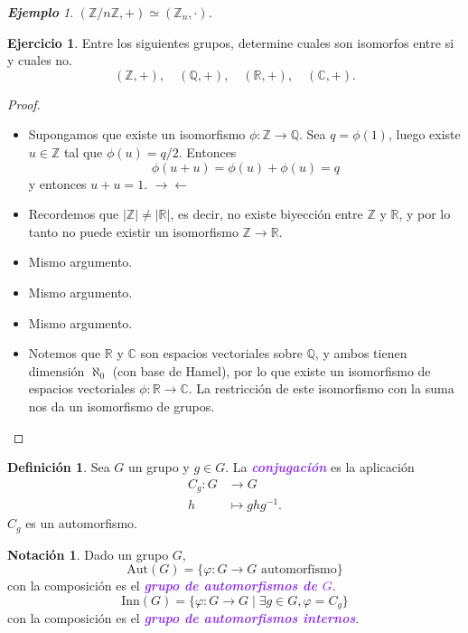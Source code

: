 \documentclass{article}
\theoremstyle{definition}
\newtheorem{definition}[theorem]{Definición}
\newtheorem{exercise}{Ejercicio}
\newtheorem*{notation}{Notación}
\theoremstyle{remark}
\newtheorem{example}[theorem]{\textbf{Ejemplo}}
\numberwithin{equation}{section}
\newcommand{\C}{\mathbb{C}}
\newcommand{\Q}{\mathbb{Q}}
\newcommand{\R}{\mathbb{R}}
\newcommand{\Z}{\mathbb{Z}}
\newcommand{\Aut}{\mathrm{Aut}}
\newcommand{\Inn}{\mathrm{Inn}}
\newcommand{\zmz}[1]{\Z/ #1 \Z}
\newcommand{\wea}[1]{\textcolor{BlueViolet}{\textbf{\emph{#1}}}}
\begin{document}
\begin{example}
  $(\zmz n, +) \simeq (\Z_n, \cdot)$.
\end{example}

\begin{exercise}
  Entre los siguientes grupos, determine cuales son isomorfos entre si y cuales no.
  \[(\Z,+), \quad (\Q,+), \quad (\R,+), \quad (\C,+).\]
\end{exercise}
\begin{proof}\
  \begin{itemize}
    \item \boxed{\Z \not\simeq \Q} Supongamos que existe un isomorfismo $\phi \colon \Z \to \Q$. Sea $q = \phi(1)$, luego existe $u \in \Z$ tal que $\phi(u) = q/2$. Entonces $$\phi(u+u) = \phi(u) + \phi(u) = q$$ y entonces $u+u = 1$. $\to\gets$
    \item \boxed{\Z \not\simeq \R} Recordemos que $|\Z| \neq |\R|$, es decir, no existe biyección entre $\Z$ y $\R$, y por lo tanto no puede existir un isomorfismo $\Z \to \R$.
    \item \boxed{\Z \not\simeq \C} Mismo argumento.
    \item \boxed{\Q \not\simeq \R} Mismo argumento.
    \item \boxed{\Q \not\simeq \C} Mismo argumento.
    \item \boxed{\R \simeq \C} Notemos que $\R$ y $\C$ son espacios vectoriales sobre $\Q$, y ambos tienen dimensión $\aleph_0$ (con base de Hamel), por lo que existe un isomorfismo de espacios vectoriales $\phi \colon \R \to \C$. La restricción de este isomorfismo con la suma nos da un isomorfismo de grupos.
  \end{itemize}
\end{proof}

\begin{definition}
  Sea $G$ un grupo y $g \in G$. La \wea{conjugación} es la aplicación
  \begin{align*}
    C_g \colon G &\to G \\
    h &\mapsto ghg^{-1}.
  \end{align*}
  $C_g$ es un automorfismo.
\end{definition}

\begin{notation}
  Dado un grupo $G$,
  $$\Aut(G) = \{\varphi \colon G \to G \text{ automorfismo}\}$$
  con la composición es el \wea{grupo de automorfismos de $G$}.
  $$\Inn(G) = \{\varphi \colon G \to G \mid \exists g \in G, \varphi = C_g\}$$
  con la composición es el \wea{grupo de automorfismos internos}.
\end{notation}
\end{document}
